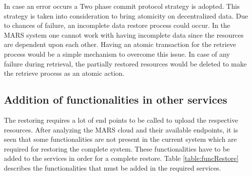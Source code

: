 In case an error occurs a Two phase commit protocol strategy is adopted. This strategy is taken into consideration to bring atomicity on decentralized data.
Due to chances of failure, an incomplete data restore process could occur. In the MARS system one cannot work with having
incomplete data since the resources are dependent upon each other. Having an atomic transaction for the retrieve process would be a simple mechanism to overcome
this issue. In case of any failure during retrieval, the partially restored resources would be deleted to make the retrieve process as an atomic action.

\subsection{Addition of functionalities in other services}
The restoring requires a lot of end points to be called to upload the respective resources. After analyzing the MARS cloud and their available endpoints, it is
seen that some functionalities are not present in the current system which are required for restoring the complete system. These functionalities have to be
added to the services in order for a complete restore. Table \ref{table:funcRestore} describes the functionalities that must be
added in the required services.

